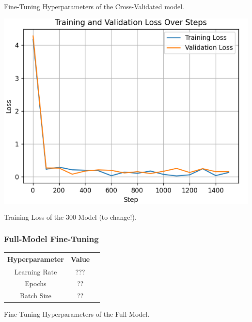 \documentclass[10pt,twocolumn,letterpaper]{article}
\begin{document}
\begin{center}
    \small {Fine-Tuning Hyperparameters of the Cross-Validated model.} 
\end{center}

\begin{center}
\includegraphics*[scale=0.55]{img/training_loss_full.png} 
\end{center}

\begin{center}
    \small {Training Loss of the 300-Model (to change!).} 
\end{center}

\subsubsection*{Full-Model Fine-Tuning}

\begin{center}

    \begin{tabular}{ccc}
        \toprule
        Hyperparameter & Value \\
        \midrule
        Learning Rate & ??? \\
        Epochs & ?? \\
        Batch Size & ?? \\
        \bottomrule
    \end{tabular} 
\end{center} 

\begin{center}
    \small {Fine-Tuning Hyperparameters of the Full-Model.} 
\end{center}
\end{document}
